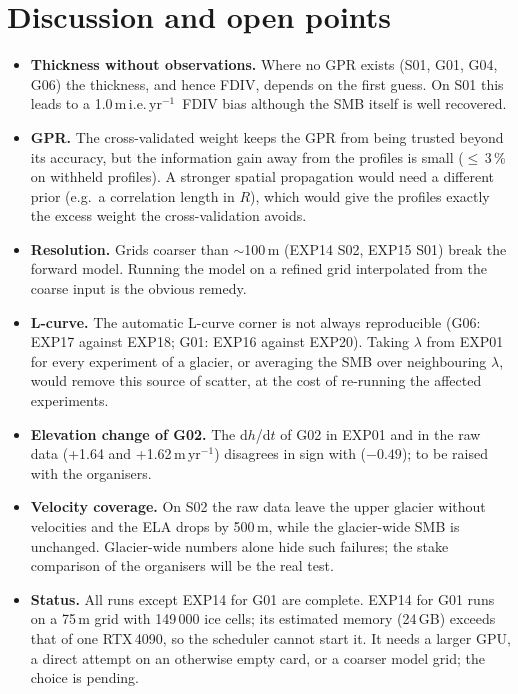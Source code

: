 \documentclass[10pt,a4paper]{article}
\newcommand{\myr}{m\,yr$^{-1}$}
\newcommand{\mie}{m\,i.e.\,yr$^{-1}$}
\begin{document}
\section{Discussion and open points}\label{sec:open}
\begin{itemize}\setlength{\itemsep}{1pt}
\item \textbf{Thickness without observations.} Where no GPR exists (S01, G01, G04, G06) the thickness, and hence FDIV,
depends on the first guess. On S01 this leads to a 1.0\,\mie\ FDIV bias although the SMB itself is well recovered.
\item \textbf{GPR.} The cross-validated weight keeps the GPR from being trusted beyond its accuracy, but the
information gain away from the profiles is small ($\le$\,3\,\% on withheld profiles). A stronger spatial propagation
would need a different prior (e.g.\ a correlation length in $R$), which would give the profiles exactly the excess
weight the cross-validation avoids.
\item \textbf{Resolution.} Grids coarser than $\sim$100\,m (EXP14 S02, EXP15 S01) break the forward model. Running the
model on a refined grid interpolated from the coarse input is the obvious remedy.
\item \textbf{L-curve.} The automatic L-curve corner is not always reproducible (G06: EXP17 against EXP18; G01: EXP16
against EXP20).
Taking $\lambda$ from EXP01 for every experiment of a glacier, or averaging the SMB over neighbouring $\lambda$, would
remove this source of scatter, at the cost of re-running the affected experiments.
\item \textbf{Elevation change of G02.} The d$h$/d$t$ of G02 in EXP01 and in the raw data (+1.64 and +1.62\,\myr) disagrees
in sign with \citet{hugonnet} ($-0.49$); to be raised with the organisers.
\item \textbf{Velocity coverage.} On S02 the raw data leave the upper glacier without velocities and the ELA drops by
500\,m, while the glacier-wide SMB is unchanged. Glacier-wide numbers alone hide such failures; the stake comparison of
the organisers will be the real test.
\item \textbf{Status.} All runs except EXP14 for G01 are complete. EXP14 for G01 runs on a 75\,m grid with 149\,000 ice
cells; its estimated memory (24\,GB) exceeds that of one RTX\,4090, so the scheduler cannot start it. It needs a larger
GPU, a direct attempt on an otherwise empty card, or a coarser model grid; the choice is pending.
\end{itemize}
\end{document}
